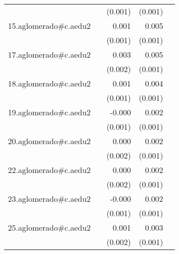 {\begin{longtable}{l*{4}{D{.}{.}{-1}}}
            &                     &     (0.001)         &     (0.001)         &                     \\
\addlinespace
15.aglomerado#c.aedu2&                     &       0.001         &       0.005\sym{***}&                     \\
            &                     &     (0.001)         &     (0.001)         &                     \\
\addlinespace
17.aglomerado#c.aedu2&                     &       0.003         &       0.005\sym{***}&                     \\
            &                     &     (0.002)         &     (0.001)         &                     \\
\addlinespace
18.aglomerado#c.aedu2&                     &       0.001         &       0.004\sym{***}&                     \\
            &                     &     (0.001)         &     (0.001)         &                     \\
\addlinespace
19.aglomerado#c.aedu2&                     &      -0.000         &       0.002\sym{**} &                     \\
            &                     &     (0.001)         &     (0.001)         &                     \\
\addlinespace
20.aglomerado#c.aedu2&                     &       0.000         &       0.002         &                     \\
            &                     &     (0.002)         &     (0.001)         &                     \\
\addlinespace
22.aglomerado#c.aedu2&                     &       0.000         &       0.002         &                     \\
            &                     &     (0.002)         &     (0.001)         &                     \\
\addlinespace
23.aglomerado#c.aedu2&                     &      -0.000         &       0.002\sym{*}  &                     \\
            &                     &     (0.001)         &     (0.001)         &                     \\
\addlinespace
25.aglomerado#c.aedu2&                     &       0.001         &       0.003         &                     \\
            &                     &     (0.002)         &     (0.001)         &                     \\

\end{longtable}}
